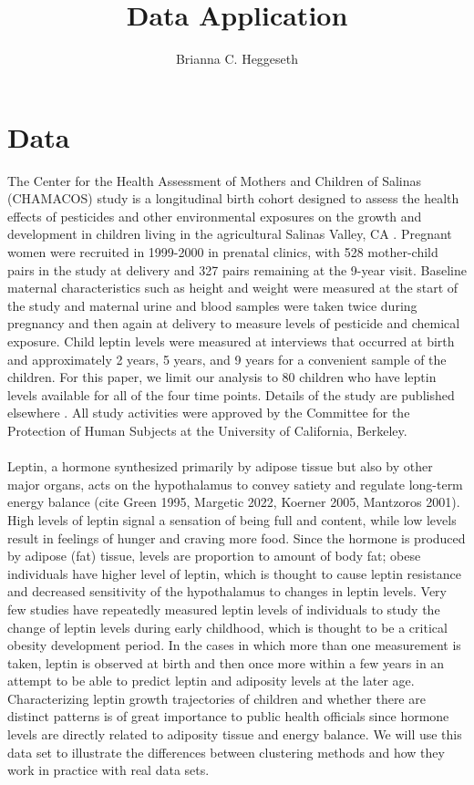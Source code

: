 \documentclass[11pt]{article}
\title{Data Application}
\author{Brianna C. Heggeseth}
\begin{document}
\doublespace
\maketitle
\section{Data}
The Center for the Health Assessment of Mothers and Children of Salinas (CHAMACOS) study is a longitudinal birth cohort designed to assess the health effects of pesticides and other environmental exposures on the growth and development in children living in the agricultural Salinas Valley, CA \cite{eskenazi2004,eskenazi2005}. Pregnant women were recruited in 1999-2000 in prenatal clinics, with 528 mother-child pairs in the study at delivery and 327 pairs remaining at the 9-year visit. Baseline maternal characteristics such as height and weight were measured at the start of the study and maternal urine and blood samples were taken twice during pregnancy and then again at delivery to measure levels of pesticide and chemical exposure. Child leptin levels were measured at interviews that occurred at birth and approximately 2 years, 5 years, and 9 years for a convenient sample of the children. For this paper, we limit our analysis to 80 children who have leptin levels available for all of the four time points. Details of the study are published elsewhere \cite{eskenazi2003}. All study activities were approved by the Committee for the Protection of Human Subjects at the University of California, Berkeley. \\\\
Leptin, a hormone synthesized primarily by adipose tissue but also by other major organs, acts on the hypothalamus to convey satiety and regulate long-term energy balance (cite Green 1995, Margetic 2022, Koerner 2005, Mantzoros 2001). High levels of leptin signal a sensation of being full and content, while low levels result in feelings of hunger and craving more food. Since the hormone is produced by adipose (fat) tissue, levels are proportion to amount of body fat; obese individuals have higher level of leptin, which is thought to cause leptin resistance and decreased sensitivity of the hypothalamus to changes in leptin levels. Very few studies have repeatedly measured leptin levels of individuals to study the change of leptin levels during early childhood, which is thought to be a critical obesity development period. In the cases in which more than one measurement is taken, leptin is observed at birth and then once more within a few years in an attempt to be able to predict leptin and adiposity levels at the later age. Characterizing leptin growth trajectories of children and whether there are distinct patterns is of great importance to public health officials since hormone levels are directly related to adiposity tissue and energy balance. We will use this data set to illustrate the differences between clustering methods and how they work in practice with real data sets.\\\\
\end{document}
